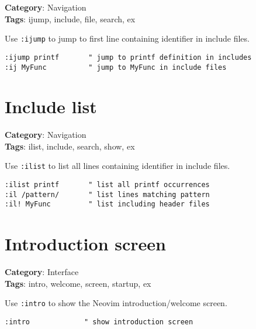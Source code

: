 {{{{{\textbf{Category}: Navigation\\ \textbf{Tags}: ijump, include, file, search, ex
\vspace{0.5cm}

Use {\footnotesize \Verb§:ijump§} to jump to first line containing identifier in include files.

\begin{Exa*}{}
\begin{Verbatim}[fontsize=\footnotesize, breaklines, breakanywhere]
:ijump printf       " jump to printf definition in includes
:ij MyFunc          " jump to MyFunc in include files
\end{Verbatim}
\end{Exa*}

\section{Include list}

\textbf{Category}: Navigation\\ \textbf{Tags}: ilist, include, search, show, ex
\vspace{0.5cm}

Use {\footnotesize \Verb§:ilist§} to list all lines containing identifier in include files.

\begin{Exa*}{}
\begin{Verbatim}[fontsize=\footnotesize, breaklines, breakanywhere]
:ilist printf       " list all printf occurrences
:il /pattern/       " list lines matching pattern
:il! MyFunc         " list including header files
\end{Verbatim}
\end{Exa*}

\section{Introduction screen}

\textbf{Category}: Interface\\ \textbf{Tags}: intro, welcome, screen, startup, ex
\vspace{0.5cm}

Use {\footnotesize \Verb§:intro§} to show the Neovim introduction/welcome screen.

\begin{Exa*}{}
\begin{Verbatim}[fontsize=\footnotesize, breaklines, breakanywhere]
:intro             " show introduction screen
\end{Verbatim}
\end{Exa*}

}}}}}
